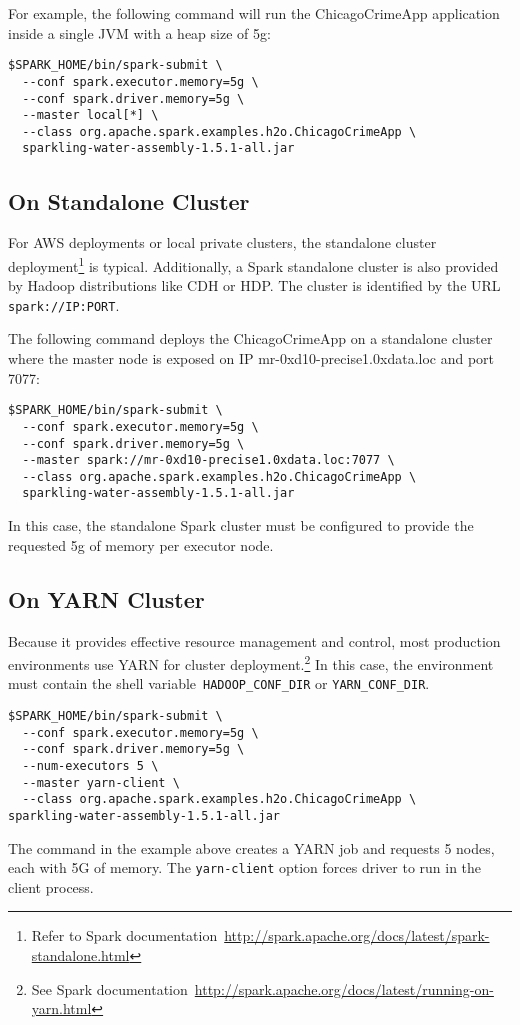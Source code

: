 For example, the following command will run the ChicagoCrimeApp application inside a single JVM with a heap size of 5g:
\begin{lstlisting}[style=Bash]
$SPARK_HOME/bin/spark-submit \ 
  --conf spark.executor.memory=5g \
  --conf spark.driver.memory=5g \
  --master local[*] \
  --class org.apache.spark.examples.h2o.ChicagoCrimeApp \
  sparkling-water-assembly-1.5.1-all.jar  
\end{lstlisting}


\subsection{On Standalone Cluster}
For AWS deployments or local private clusters, the standalone cluster deployment\footnote{Refer to Spark documentation~\url{http://spark.apache.org/docs/latest/spark-standalone.html}} is typical. Additionally, a Spark standalone cluster is also provided by Hadoop distributions like CDH or HDP. The cluster is identified by the URL \texttt{spark://IP:PORT}.

The following command deploys the ChicagoCrimeApp on a standalone cluster where the master node is exposed on IP mr-0xd10-precise1.0xdata.loc and port 7077:

\begin{lstlisting}[style=Bash]
$SPARK_HOME/bin/spark-submit \ 
  --conf spark.executor.memory=5g \
  --conf spark.driver.memory=5g \
  --master spark://mr-0xd10-precise1.0xdata.loc:7077 \
  --class org.apache.spark.examples.h2o.ChicagoCrimeApp \
  sparkling-water-assembly-1.5.1-all.jar  
\end{lstlisting}

In this case, the standalone Spark cluster must be configured to provide the requested 5g of memory per executor node. 

\subsection{On YARN Cluster}
Because it provides effective resource management and control, most production environments use YARN for cluster deployment.\footnote{See Spark documentation~\url{http://spark.apache.org/docs/latest/running-on-yarn.html}} 
In this case, the environment must contain the shell variable~\texttt{HADOOP\_CONF\_DIR} or \texttt{YARN\_CONF\_DIR}.

\begin{lstlisting}[style=Bash]
$SPARK_HOME/bin/spark-submit \ 
  --conf spark.executor.memory=5g \
  --conf spark.driver.memory=5g \
  --num-executors 5 \
  --master yarn-client \
  --class org.apache.spark.examples.h2o.ChicagoCrimeApp \
sparkling-water-assembly-1.5.1-all.jar  
\end{lstlisting}

The command in the example above creates a YARN job and requests 5 nodes, each with 5G of memory. The \texttt{yarn-client} option forces driver to run in the client process.
